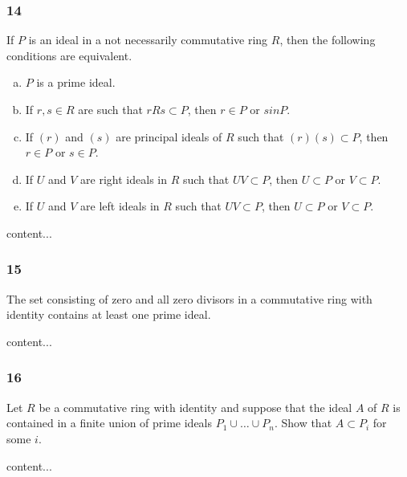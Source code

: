 \subsubsection*{14}
\begin{graybox}
	If $P$ is an ideal in a not necessarily commutative ring $R$, then the following conditions are equivalent.
	\begin{enumerate}[(a)]
		\item $P$ is a prime ideal.
		\item If $r,s \in R$ are such that $rRs \subset P$, then $r \in P$ or $s in P$.
		\item If $(r)$ and $(s)$ are principal ideals of $R$ such that $(r)(s) \subset P$, then $r \in P$ or $s \in P$.
		\item If $U$ and $V$ are right ideals in $R$ such that $UV \subset P$, then $U \subset P$ or $V \subset P$.
		\item If $U$ and $V$ are left ideals in $R$ such that $UV \subset P$, then $U \subset P$ or $V \subset P$.
	\end{enumerate}

\end{graybox}
	\begin{solution}
	content...
\end{solution}

\subsubsection*{15}
\begin{graybox}
	The set consisting of zero and all zero divisors in a commutative ring with identity contains at least one prime ideal.
\end{graybox}
\begin{solution}
	content...
\end{solution}

\subsubsection*{16}
\begin{graybox}
	Let $R$ be a commutative ring with identity and suppose that the ideal $A$ of $R$ is contained in a finite union of prime ideals $P_1 \cup \dots \cup P_n$. Show that $A \subset P_i$ for some $i$.
\end{graybox}
\begin{solution}
	content...
\end{solution}

